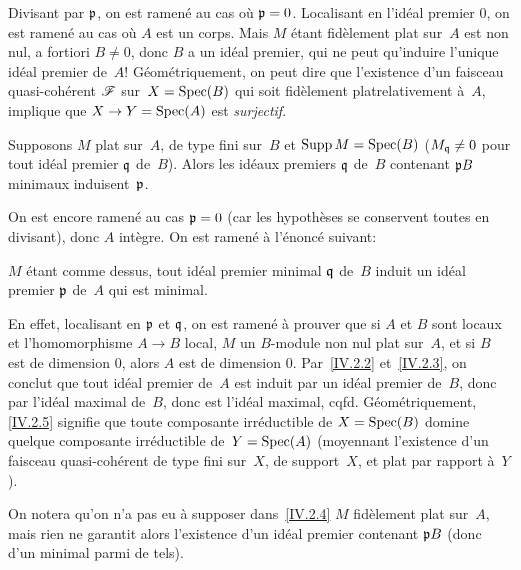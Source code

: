 Divisant par $\mathfrak{p}$, on est ramen\'e au cas o\`u
$\mathfrak{p}=0$. Localisant en l'id\'eal premier $0$, on est ramen\'e
au cas o\`u $A$ est un corps. Mais $M$ \'etant fid\`element plat
sur~$A$ est non nul, a fortiori $B \neq 0$, donc $B$ a un id\'eal
premier, qui ne peut qu'induire l'unique id\'eal premier de~$A$!
G\'eom\'etriquement, on peut dire que l'existence d'un faisceau
quasi-coh\'erent $\cal{F}$ sur~$X=\operatorname{Spec} (B)$ qui soit
\og fid\`element plat\fg relativement \`a~$A$, implique que $X \to
Y=\Spec (A)$ est \emph{surjectif}.

\begin{corollaire}
\label{IV.2.4}
Supposons $M$ plat sur~$A$, de type fini sur~$B$ et
$\operatorname{Supp} M=\operatorname{Spec}(B)$
(\ie $M_{\mathfrak{q}}\neq 0$ pour tout id\'eal premier $\mathfrak{q}$
de~$B$). Alors les id\'eaux premiers $\mathfrak{q}$ de~$B$ contenant
$\mathfrak{p}B$ minimaux induisent~$\mathfrak{p}$.
\end{corollaire}

On
est encore ramen\'e au cas $\mathfrak{p}=0$ (car les hypoth\`eses se
conservent toutes en divisant), donc $A$ int\`egre. On est
ramen\'e \`a l'\'enonc\'e suivant:

\begin{corollaire}
\label{IV.2.5}
$M$ \'etant comme dessus, tout id\'eal premier minimal $\mathfrak{q}$
de~$B$ induit un id\'eal premier $\mathfrak{p}$ de~$A$ qui est minimal.
\end{corollaire}

En effet, localisant en $\mathfrak{p}$ et $\mathfrak{q}$, on est ramen\'e
\`a prouver que si $A$ et $B$ sont locaux et l'homomorphisme $A \to
B$ local, $M$ un $B$-module non nul plat sur~$A$, et si $B$ est de
dimension $0$, alors $A$ est de dimension $0$. Par~\ref{IV.2.2}
et~\ref{IV.2.3}, on conclut que tout id\'eal premier de~$A$ est
induit par un id\'eal premier de~$B$, donc par l'id\'eal maximal
de~$B$,
donc est l'id\'eal maximal, cqfd. G\'eom\'etriquement,
\ref{IV.2.5} signifie que toute composante irr\'eductible de
$X=\operatorname{Spec} (B)$
domine quelque composante irr\'eductible de~$Y=\operatorname{Spec} (A)$ (moyennant
l'existence d'un faisceau quasi-coh\'erent de type fini sur~$X$, de
support~$X$, et plat par rapport \`a~$Y$).

On notera qu'on n'a pas eu \`a supposer dans~\ref{IV.2.4} $M$
fid\`element plat sur~$A$, mais rien ne garantit alors l'existence
d'un id\'eal premier contenant $\mathfrak{p}B$ (donc d'un minimal parmi
de tels).

